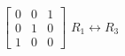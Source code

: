 {$\begin{bmatrix}
		0 & 0 & 1 \\ 
		0 & 1 & 0 \\ 
		1 & 0 & 0
		\end{bmatrix}$ \label{em_ex_last}}
{$R_1\leftrightarrow R_3$}